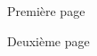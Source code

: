 \documentclass{classe-tex3R}
\begin{document}
Première page

\newpage

Deuxième page
\end{document}
